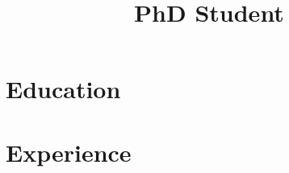 \documentclass[11pt,a4paper,sans]{moderncv}
\title{PhD Student}
\begin{document}
\makecvtitle

\section{Education}

\section{Experience}
\end{document}
